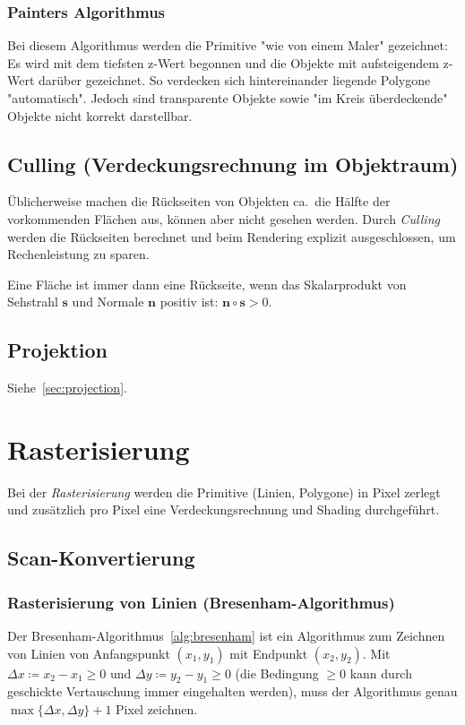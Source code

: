 \documentclass[a4paper, 11pt, accentcolor = tud3b]{tudreport}
\renewcommand{\vec}[1]{\boldsymbol{\mathbf{#1}}}
\newcommand{\ca}{ca.~}
\begin{document}
				\subsubsection{Painters Algorithmus}
					Bei diesem Algorithmus werden die Primitive "wie von einem Maler" gezeichnet: Es wird mit dem tiefsten z-Wert begonnen und die Objekte mit aufsteigendem z-Wert darüber gezeichnet. So verdecken sich hintereinander liegende Polygone "automatisch". Jedoch sind transparente Objekte sowie "im Kreis überdeckende" Objekte nicht korrekt darstellbar.

			\subsection{Culling (Verdeckungsrechnung im Objektraum)}
				Üblicherweise machen die Rückseiten von Objekten \ca die Hälfte der vorkommenden Flächen aus, können aber nicht gesehen werden. Durch \emph{Culling} werden die Rückseiten berechnet und beim Rendering explizit ausgeschlossen, um Rechenleistung zu sparen.
				
				Eine Fläche ist immer dann eine Rückseite, wenn das Skalarprodukt von Sehstrahl \( \vec{s} \) und Normale \( \vec{n} \) positiv ist: \( \vec{n} \circ \vec{s} > 0 \).

			\subsection{Projektion}
				Siehe~\ref{sec:projection}.

		\section{Rasterisierung}
			Bei der \emph{Rasterisierung} werden die Primitive (Linien, Polygone) in Pixel zerlegt und zusätzlich pro Pixel eine Verdeckungsrechnung und Shading durchgeführt.

			\subsection{Scan-Konvertierung}
				\subsubsection{Rasterisierung von Linien (Bresenham-Algorithmus)}
					Der Bresenham-Algorithmus~\ref{alg:bresenham} ist ein Algorithmus zum Zeichnen von Linien von Anfangspunkt \( (x_1, y_1) \) mit Endpunkt \( (x_2, y_2) \). Mit \( \Delta x \coloneqq x_2 - x_1 \geq 0 \) und \( \Delta y \coloneqq y_2 - y_1 \geq 0 \) (die Bedingung \( \geq 0 \) kann durch geschickte Vertauschung immer eingehalten werden), muss der Algorithmus genau \( \max \big\{ \Delta x, \Delta y \big\} + 1 \) Pixel zeichnen.
					
\end{document}
